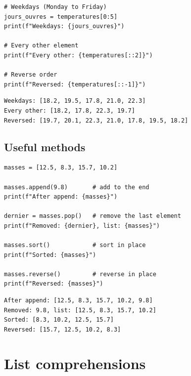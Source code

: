 \begin{codeblock}[title=\textbf{Python}]
\begin{verbatim}
# Weekdays (Monday to Friday)
jours_ouvres = temperatures[0:5]
print(f"Weekdays: {jours_ouvres}")

# Every other element
print(f"Every other: {temperatures[::2]}")

# Reverse order
print(f"Reversed: {temperatures[::-1]}")
\end{verbatim}
\end{codeblock}

\begin{codeoutput}
\begin{verbatim}
Weekdays: [18.2, 19.5, 17.8, 21.0, 22.3]
Every other: [18.2, 17.8, 22.3, 19.7]
Reversed: [19.7, 20.1, 22.3, 21.0, 17.8, 19.5, 18.2]
\end{verbatim}
\end{codeoutput}

\subsection{Useful methods}

\begin{codeblock}[title=\textbf{Python}]
\begin{verbatim}
masses = [12.5, 8.3, 15.7, 10.2]

masses.append(9.8)       # add to the end
print(f"After append: {masses}")

dernier = masses.pop()   # remove the last element
print(f"Removed: {dernier}, list: {masses}")

masses.sort()            # sort in place
print(f"Sorted: {masses}")

masses.reverse()         # reverse in place
print(f"Reversed: {masses}")
\end{verbatim}
\end{codeblock}

\begin{codeoutput}
\begin{verbatim}
After append: [12.5, 8.3, 15.7, 10.2, 9.8]
Removed: 9.8, list: [12.5, 8.3, 15.7, 10.2]
Sorted: [8.3, 10.2, 12.5, 15.7]
Reversed: [15.7, 12.5, 10.2, 8.3]
\end{verbatim}
\end{codeoutput}

\section{List comprehensions}

